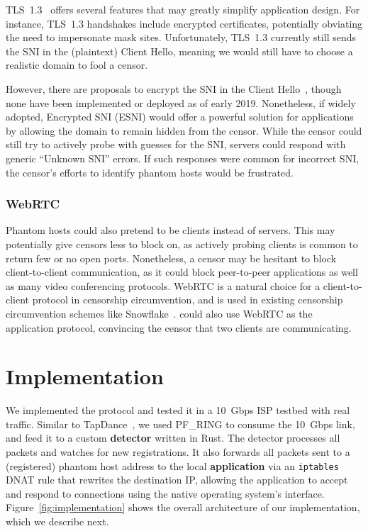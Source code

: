 \documentclass[letterpaper,twocolumn,10pt]{article}
\begin{document}
TLS~1.3~\cite{tls13} offers several features that may greatly simplify 
\scheme application design. For instance, TLS~1.3 handshakes include encrypted
certificates, potentially obviating the need to impersonate mask sites.
Unfortunately, TLS~1.3 currently still sends the SNI in the (plaintext) Client
Hello, meaning we would still have to choose a realistic domain to fool a
censor.

However, there are proposals to encrypt the SNI in the Client Hello~\cite{esni},
though none have been implemented or deployed as of early 2019. Nonetheless,
if widely adopted, Encrypted SNI (ESNI) would offer a powerful solution for
\scheme applications by allowing the domain to remain hidden from the censor.
While the censor could still try to actively probe with guesses for the SNI,
servers could respond with generic ``Unknown SNI'' errors. If such responses
were common for incorrect SNI, the censor's efforts to identify phantom hosts
would be frustrated.

\subsubsection{WebRTC}
\label{sec:webrtc}

Phantom hosts could also pretend to be clients instead of servers. This may
potentially give censors less to block on, as actively probing clients is common
to return few or no open ports. Nonetheless, a censor may be hesitant to block
client-to-client communication, as it could block peer-to-peer applications as
well as many video conferencing protocols. WebRTC is a
natural choice for a client-to-client protocol in censorship circumvention,
and is used in existing censorship circumvention schemes like
Snowflake~\cite{snowflake}. \scheme could also use WebRTC as the
application protocol, convincing the censor that two clients are communicating.

\section{Implementation}
\label{sec:implementation}

We implemented the \scheme protocol and tested it in a 10~Gbps ISP testbed
with real traffic. Similar to TapDance~\cite{tapdance14}, we used PF\_RING to
consume the 10~Gbps link, and feed it to a custom \textbf{detector} written in Rust. The
detector processes all packets and watches for new registrations. It also
forwards all packets sent to a (registered) phantom host address to the local
\textbf{application} via an \texttt{iptables} DNAT rule that rewrites the destination IP,
allowing the application to accept and respond to connections using the native
operating system's interface. Figure~\ref{fig:implementation} shows the overall
architecture of our implementation, which we describe next.
\end{document}
